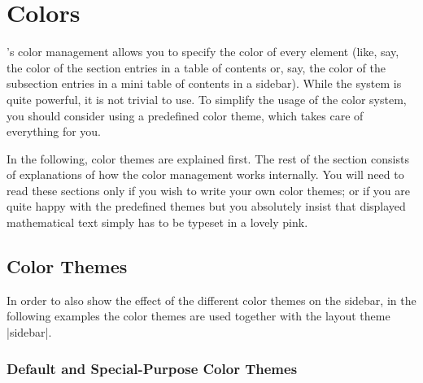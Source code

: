 %

\section{Colors}

\label{section-colors}

\beamer's color management allows you to specify the color of every
element (like, say, the color of the section entries in a table of
contents or, say, the color of the subsection entries in a mini table
of contents in a sidebar). While the system is quite powerful, it is
not trivial to use. To simplify the usage of the color system, you
should consider using a predefined color theme, which takes care of
everything for you.

In the following, color themes are explained first. The rest of the
section consists of explanations of how the color management works
internally. You will need to read these sections only if you wish to
write your own color themes; or if you are quite happy with the
predefined themes but you absolutely insist that displayed
mathematical text simply has to be typeset in a lovely pink.



\subsection{Color Themes}

In order to also show the effect of the different color themes on the
sidebar, in the following examples the color themes are used together
with the layout theme |sidebar|.

\subsubsection{Default and Special-Purpose Color Themes}

